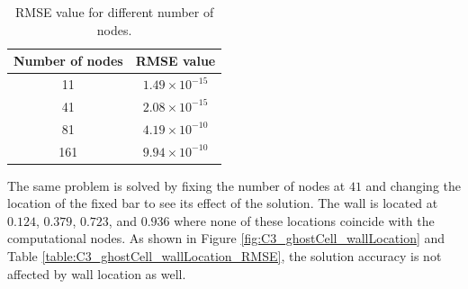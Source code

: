 %
%
\begin{table}[H]
\centering
\begin{tabular}{c | c}
     Number of nodes & RMSE value \\ \hline \hline
     11 & $1.49 \times 10^{-15}$ \\ \hline
     41 & $2.08 \times 10^{-15}$ \\ \hline
     81 & $4.19 \times 10^{-10}$ \\ \hline
     161 & $9.94 \times 10^{-10}$ \\
\end{tabular}
\caption{RMSE value for different number of nodes.}
\label{table:C3_ghostCell_nodeNumber_RMSE}
\end{table}
%
The same problem is solved by fixing the number of nodes at $41$ and changing the location of the fixed bar to see its effect of the solution. The wall is located at $0.124$, $0.379$, $0.723$, and $0.936$ where none of these locations coincide with the computational nodes. As shown in Figure \ref{fig:C3_ghostCell_wallLocation} and Table \ref{table:C3_ghostCell_wallLocation_RMSE}, the solution accuracy is not affected by wall location as well.
%
